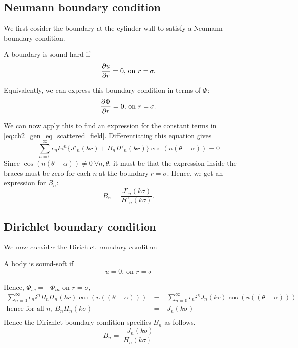\subsection{Neumann boundary condition}\label{ss:ch2_neumann_bcs}
We first cosider the boundary at the cylinder wall to satisfy a Neumann boundary condition.
  \begin{defn}
    \parencite[$\S$1.3.2]{martin06scattering} A boundary is sound-hard if
      \begin{align*}
        \frac{\partial u}{\partial r} = 0 \text{,  on } r = \sigma.
      \end{align*}
  \end{defn} \par
%
Equivalently, we can express this boundary condition in terms of $\Phi$:
  \begin{align*}
    \frac{\partial \Phi}{\partial r}=0 \text{,  on } r = \sigma.
  \end{align*} \par
%
We can now apply this to find an expression for the constant terms in \eqref{eq:ch2_gen_eq_scattered_field}. Differentiating this equation gives
  \begin{equation}
    \sum^\infty_{n=0} \epsilon_n k i^n
    \{ J'_n(kr) + B_n H'_n(kr) \} \cos(n(\theta-\alpha)) = 0
  \end{equation}
Since $\cos(n(\theta - \alpha)) \neq 0 ~ \forall n, \theta$, it must be that the expression inside the braces must be zero for each $n$ at the boundary $r=\sigma$. Hence, we get an expression for $B_n$:
  \begin{equation}
    B_n= \frac{J'_n(k\sigma)}{H'_n(k\sigma)}.
  \end{equation}
\subsection{Dirichlet boundary condition}\label{ss:ch2_dirichlet_bcs}
We now consider the Dirichlet boundary condition.
  \begin{defn}
    \parencite[$\S$1.3.2]{martin06scattering} A body is sound-soft if
      \[
      u = 0 \text{,  on } r = \sigma
      \]
  \end{defn}
Hence, $\Phi_{sc} = - \Phi_{in}$ on $r=\sigma$,
  \begin{align*}
    \sum^\infty_{n=0} \epsilon_n i^n B_n H_n(kr) \cos(n((\theta-\alpha)))
    & = - \sum^\infty_{n=0} \epsilon_n i^n J_n(kr) \cos(n((\theta-\alpha))) \\
    \text{hence for all } n,~ B_n H_n (k\sigma) &= - J_n (k\sigma) \\
  \end{align*}
Hence the Dirichlet boundary condition specifies $B_n$ as follows.
  \begin{equation}
    B_n = \frac{- J_n(k\sigma)}{H_n(k\sigma)}
  \end{equation}
